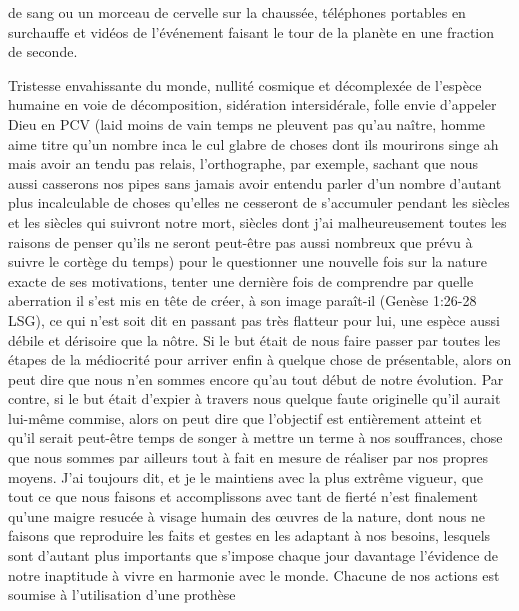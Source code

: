 de sang ou un morceau de cervelle sur la chaussée, téléphones portables en surchauffe et vidéos de l’événement faisant le tour de la planète en une fraction de seconde. 

%

Tristesse envahissante du monde, nullité cosmique et décomplexée de l’espèce humaine en voie de décomposition, sidération intersidérale, folle envie d’appeler Dieu en PCV (laid moins de vain temps ne pleuvent pas qu’au naître, homme aime titre qu’un nombre inca le cul glabre de choses dont ils mourirons singe ah mais avoir an tendu pas relais, l’orthographe, par exemple, sachant que nous aussi casserons nos pipes sans jamais avoir entendu parler d’un nombre d’autant plus incalculable de choses qu’elles ne cesseront de s’accumuler pendant les siècles et les siècles qui suivront notre mort, siècles dont j’ai malheureusement toutes les raisons de penser qu’ils ne seront peut-être pas aussi nombreux que prévu à suivre le cortège du temps) pour le questionner une nouvelle fois sur la nature exacte de ses motivations, tenter une dernière fois de comprendre par quelle aberration il s’est mis en tête de créer, à son image paraît-il (Genèse 1:26-28 LSG), ce qui n’est soit dit en passant pas très flatteur pour lui, une espèce aussi débile et dérisoire que la nôtre. Si le but était de nous faire passer par toutes les étapes de la médiocrité pour arriver enfin à quelque chose de présentable, alors on peut dire que nous n’en sommes encore qu’au tout début de notre évolution. Par contre, si le but était d’expier à travers nous quelque faute originelle qu’il aurait lui-même commise, alors on peut dire que l’objectif est entièrement atteint et qu’il serait peut-être temps de songer à mettre un terme à nos souffrances, chose que nous sommes par ailleurs tout à fait en mesure de réaliser par nos propres moyens. J’ai toujours dit, et je le maintiens avec la plus extrême vigueur, que tout ce que nous faisons et accomplissons avec tant de fierté n’est finalement qu’une maigre resucée à visage humain des œuvres de la nature, dont nous ne faisons que reproduire les faits et gestes en les adaptant à nos besoins, lesquels sont d’autant plus importants que s’impose chaque jour davantage l’évidence de notre inaptitude à vivre en harmonie avec le monde. Chacune de nos actions est soumise à l’utilisation d’une prothèse 